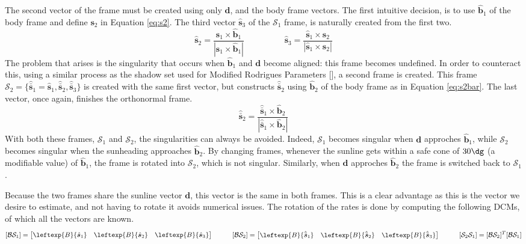 \documentclass[]{BasiliskReportMemo}
\begin{document}
The second vector of the frame must be created using only $\bm d$, and the body frame vectors. The first intuitive decision, is to use $\hat{\bm b}_1$ of the body frame and define $\bm s_2$ in Equation \eqref{eq:s2}. The third vector $\hat{\bm s}_3$ of the $\mathcal{S}_1$ frame, is naturally created from the first two.
\begin{equation}\label{eq:s2}
\hat{\bm s}_2 = \frac{\hat{\bm s}_1 \times \hat{\bm b}_1}{|\hat{\bm s}_1 \times \hat{\bm b}_1|} \hspace{2cm} \hat{\bm s}_3 = \frac{\hat{\bm s}_1 \times \hat{\bm s}_2}{|\hat{\bm s}_1 \times \hat{\bm s}_2|}
\end{equation}
The problem that arises is the singularity that occurs when $\hat{\bm b}_1$ and $\bm d$ become aligned: this frame becomes undefined. In order to counteract this, using a similar process as the shadow set used for Modified Rodrigues Parameters [], a second frame is created. This frame $\mathcal{S}_2 =  \{\hat{\bar{\bm s}}_1 = \hat{\bm s}_1, \hat{\bar{\bm s}}_2 , \hat{\bar{\bm s}}_3 \}$ is created with the same first vector, but constructs $\hat{ \bar{\bm s}}_2$ using $\hat{\bm b}_2$ of the body frame as in Equation \eqref{eq:s2bar}. The last vector, once again, finishes the orthonormal frame.
\begin{equation}\label{eq:s2bar}
\hat{\bar{\bm s}}_2 = \frac{\hat{\bar{\bm s}}_1 \times \hat{\bm b}_2}{|\hat{\bar{\bm s}}_1 \times \hat{\bm b}_2|}
\end{equation}
With both these frames, $\mathcal{S}_1$ and $\mathcal{S}_2$, the singularities can always be avoided. Indeed, $\mathcal{S}_1$ becomes singular when $\bm d$ approches $\hat{\bm b}_1$, while $\mathcal{S}_2$ becomes singular when the sunheading approaches $\hat{\bm b}_2$. By changing frames, whenever the sunline gets within a safe cone of $30 \dg$ (a modifiable value) of $\hat{\bm b}_1$, the frame is rotated into $\mathcal{S}_2$, which is not singular. Similarly, when $\bm d$ approches $\hat{\bm b}_2$ the frame is switched back to $\mathcal{S}_1$.

Because the two frames share the sunline vector $\bm d$, this vector is the same in both frames. This is a clear advantage as this is the vector we desire to estimate, and not having to rotate it avoids numerical issues.
The rotation of the rates is done by computing the following DCMs, of which all the vectors are known.
\begin{equation}\label{eq:DCMs}
 [\mathcal{B}\mathcal{S}_1] = \begin{bmatrix} \leftexp{B}{\hat{\bm s}_1} & \leftexp{B}{\hat{\bm s}_2} & \leftexp{B}{\hat{\bm s}_3}\end{bmatrix} \hspace{1cm}  [\mathcal{B}\mathcal{S}_2] = \begin{bmatrix} \leftexp{B}{\hat{\bar{\bm s}}_1} & \leftexp{B}{\hat{\bar{\bm s}}_2} & \leftexp{B}{\hat{\bar{\bm s}}_3}\end{bmatrix} \hspace{1cm}  [\mathcal{S}_2\mathcal{S}_1] = [\mathcal{B}\mathcal{S}_2] ^T [\mathcal{B}\mathcal{S}_1] 
\end{equation}
\end{document}
